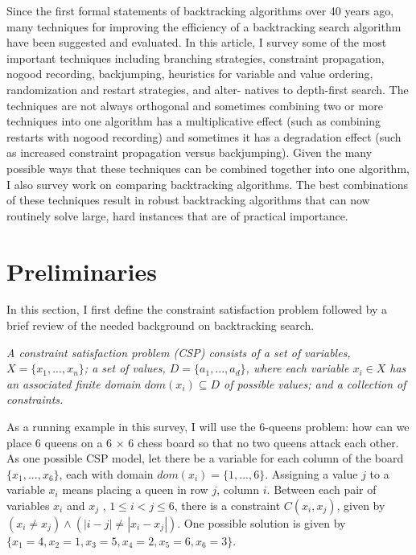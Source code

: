 \documentclass{article}
\begin{document}
Since the first formal statements of backtracking algorithms over 40 years ago,
many techniques for improving the efficiency of a backtracking search algorithm have been
suggested and evaluated. In this article, I survey some of the most important techniques
including branching strategies, constraint propagation, nogood recording, backjumping,
heuristics for variable and value ordering, randomization and restart strategies, and alter-
natives to depth-first search. The techniques are not always orthogonal and sometimes
combining two or more techniques into one algorithm has a multiplicative effect (such as
combining restarts with nogood recording) and sometimes it has a degradation effect (such
as increased constraint propagation versus backjumping). Given the many possible ways
that these techniques can be combined together into one algorithm, I also survey work on
comparing backtracking algorithms. The best combinations of these techniques result in
robust backtracking algorithms that can now routinely solve large, hard instances that are of practical importance.
\section{Preliminaries}
In this section, I first define the constraint satisfaction problem followed by a brief review
of the needed background on backtracking search.
\begin{definition}[CSP] 
    \textit{A constraint satisfaction problem (CSP) consists of a set of variables,
    $X = \{ x_1, . . . , x_n\}$; a set of values, $D = \{a_1, . . . , a_d\}$, where each variable $x_i \in X$ has an associated finite domain $dom(x_i) \subseteq D$ of possible values; and a collection of constraints.}
\end{definition}
As a running example in this survey, I will use the 6-queens problem: how can we place
6 queens on a 6 $\times$ 6 chess board so that no two queens attack each other. As one possible
CSP model, let there be a variable for each column of the board $\{x_1, . . . , x_6\}$, each with
domain $dom(x_i) = \{1, . . . , 6\}$. Assigning a value $j$ to a variable $x_i$ means placing a queen in row $j$, column $i$. Between each pair of variables $x_i$ and $x_j$ , $1 \le i < j \le 6$, there is a constraint $C(x_i, x_j )$, given by $(x_i \neq x_j ) \wedge (|i - j| \neq |x_i - x_j |)$. One possible solution is given by $\{x_1 = 4, x_2 = 1, x_3 = 5, x_4 = 2, x_5 = 6, x_6 = 3\}$.
\end{document}
